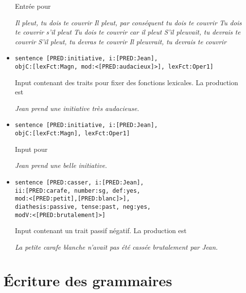 \documentclass[11pt]{article}
\begin{document}
\begin{itemize}
Entrée pour 
\begin{exe}
\ex \begin{xlist} 
\ex \textit{Il pleut, tu dois te couvrir}
\ex \textit{Il pleut, par conséquent tu dois te couvrir}
\ex \textit{Tu dois te couvrir s'il pleut}
\ex \textit{Tu dois te couvrir car il pleut}
\ex \textit{S'il pleuvait, tu devrais te couvrir}
\ex \textit{S'il pleut, tu devras te couvrir}
\ex \textit{Il pleuvrait, tu devrais te couvrir}
\end{xlist}
\end{exe}

\item 
\begin{verbatim}
sentence [PRED:initiative, i:[PRED:Jean], 
objC:[lexFct:Magn, mod:<[PRED:audacieux]>], lexFct:Oper1]
\end{verbatim}

Input contenant des traits pour fixer des fonctions lexicales. La
production est 
\begin{exe}
\ex \textit{Jean prend une initiative très audacieuse.}
\end{exe}

\item 
\begin{verbatim}
sentence [PRED:initiative, i:[PRED:Jean], 
objC:[lexFct:Magn], lexFct:Oper1]
\end{verbatim}

Input pour

\begin{exe}
\ex \textit{Jean prend une belle initiative.}
\end{exe}

\item 
\begin{verbatim}
sentence [PRED:casser, i:[PRED:Jean], 
ii:[PRED:carafe, number:sg, def:yes, 
mod:<[PRED:petit],[PRED:blanc]>], 
diathesis:passive, tense:past, neg:yes, 
modV:<[PRED:brutalement]>]
\end{verbatim}

Input contenant un trait passif négatif. La
production est
\begin{exe}
\ex \textit{La petite carafe blanche n'avait pas été cassée
brutalement par Jean.}
\end{exe}

\end{itemize}

\section{Écriture des grammaires}
\end{document}
